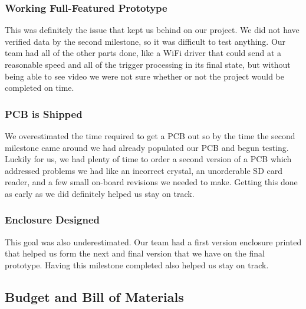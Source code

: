 \documentclass[12pt]{article}
\begin{document}
\subsubsection{Working Full-Featured Prototype}
This was definitely the issue that kept us behind on our project. We did not
have verified data by the second milestone, so it was difficult to test
anything. Our team had all of the other parts done, like a WiFi driver that
could send at a reasonable speed and all of the trigger processing in its final
state, but without being able to see video we were not sure whether or not the
project would be completed on time.

\subsubsection{PCB is Shipped}
We overestimated the time required to get a PCB out so by the time the second
milestone came around we had already populated our PCB and begun testing.
Luckily for us, we had plenty of time to order a second version of a PCB which
addressed problems we had like an incorrect crystal, an unorderable SD card
reader, and a few small on-board revisions we needed to make. Getting this done
as early as we did definitely helped us stay on track.

\subsubsection{Enclosure Designed}
This goal was also underestimated. Our team had a first version enclosure
printed that helped us form the next and final version that we have on the
final prototype. Having this milestone completed also helped us stay on track.

\subsection{Budget and Bill of Materials}
\end{document}
